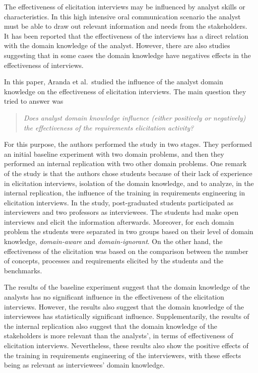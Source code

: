 \documentclass[]{llncs}
\begin{document}
The effectiveness of elicitation interviews may be influenced by analyst
skills or characteristics. In this high intensive oral communication
scenario the analyst must be able to draw out relevant information and
needs from the stakeholders. It has been reported that the effectiveness
of the interviews has a direct relation with the domain knowledge of the
analyst. However, there are also studies suggesting that in some cases
the domain knowledge have negatives effects in the effectiveness of
interviews.

In this paper, Aranda et al.~studied the influence of the analyst domain
knowledge on the effectiveness of elicitation interviews. The main
question they tried to answer was

\begin{quote}
\emph{Does analyst domain knowledge influence (either positively or
negatively) the effectiveness of the requirements elicitation activity?}
\end{quote}

For this purpose, the authors performed the study in two stages. They
performed an initial baseline experiment with two domain problems, and
then they performed an internal replication with two other domain
problems. One remark of the study is that the authors chose students
because of their lack of experience in elicitation interviews, isolation
of the domain knowledge, and to analyze, in the internal replication,
the influence of the training in requirements engineering in elicitation
interviews. In the study, post-graduated students participated as
interviewers and two professors as interviewees. The students had make
open interviews and elicit the information afterwards. Moreover, for
each domain problem the students were separated in two groups based on
their level of domain knowledge, \emph{domain-aware} and
\emph{domain-ignorant}. On the other hand, the effectiveness of the
elicitation was based on the comparison between the number of concepts,
processes and requirements elicited by the students and the benchmarks.

The results of the baseline experiment suggest that the domain knowledge
of the analysts has no significant influence in the effectiveness of the
elicitation interviews. However, the results also suggest that the
domain knowledge of the interviewees has statistically significant
influence. Supplementarily, the results of the internal replication also
suggest that the domain knowledge of the stakeholders is more relevant
than the analysts', in terms of effectiveness of elicitation interviews.
Nevertheless, these results also show the positive effects of the
training in requirements engineering of the interviewers, with these
effects being as relevant as interviewees' domain knowledge.
\end{document}
